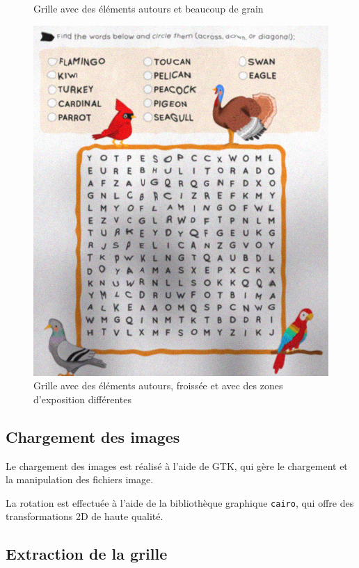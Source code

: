 \documentclass{article}
\begin{document}
\begin{figure}[!htb]
      \caption{Grille avec des éléments autours et beaucoup de grain}
    \endminipage\hfill
      \includegraphics[width=\linewidth]{ressources/image_3.png}
      \caption{Grille avec des éléments autours, froissée et avec des zones d'exposition différentes}
    \endminipage
\end{figure}


\subsection{Chargement des images}

Le chargement des images est réalisé à l'aide de GTK, qui gère le chargement et la manipulation des fichiers image.

La rotation est effectuée à l'aide de la bibliothèque graphique \texttt{cairo}, qui offre des transformations 2D de haute qualité.

\subsection{Extraction de la grille}
\end{document}
